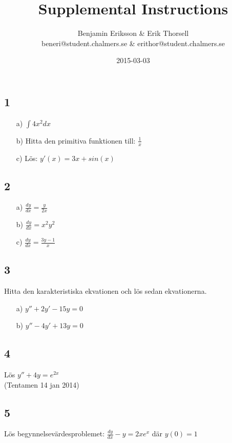 \documentclass{article}
\title{Supplemental Instructions}
\author{Benjamin Eriksson \& Erik Thorsell \\ 
		\small{beneri@student.chalmers.se} \&
		\small{erithor@student.chalmers.se}
}
\date{
      2015-03-03
     }
\begin{document}
\maketitle

\subsection*{1}
\begin{itemize}
	\item[a) ] $\int 4x^2 dx$
	\item[b) ] Hitta den primitiva funktionen till: $\frac{1}{x}$
	\item[c) ] Lös: $y'(x) = 3x + sin(x)$
\end{itemize}


\subsection*{2}
\begin{itemize}
    \item[a)] $\frac{dy}{dx} = \frac{y}{2x}$
    \item[b)] $\frac{dy}{dx} = x^2 y^2$
    \item[c)] $\frac{dy}{dx} = \frac{3y-1}{x}$
\end{itemize}

\subsection*{3}
Hitta den karakteristiska ekvationen och lös sedan ekvationerna.
\begin{itemize}
	\item[a) ] $y'' + 2y' - 15y = 0$
	\item[b) ] $y'' - 4y' + 13y = 0$
\end{itemize} 

\subsection*{4}
Lös  \quad $y'' + 4y = e^{2x}$ \\ 
(Tentamen 14 jan 2014)

\subsection*{5}
Lös begynnelsevärdesproblemet: $\frac{dy}{dx} - y = 2xe^x$ där $y(0) = 1$ 
\end{document}
